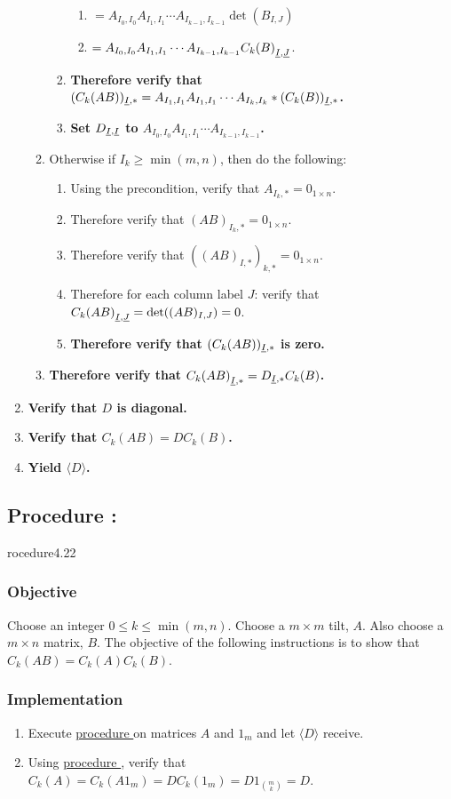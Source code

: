 \documentclass{article}
\newcommand{\ul}[1]{\protect\underline{#1}}
\newcounter{procedure}[part]
\newcommand{\procedure}[1]{\subsection*{Procedure \thepart:\theprocedure}\label{sec:procedure #1}\global\expandafter\edef\csname procedure#1\endcsname{\thepart:\theprocedure}\addtocounter{procedure}{1}}
\newcommand{\objective}{\subsubsection*{Objective}}
\newcommand{\implementation}{\subsubsection*{Implementation}}
\newcommand{\procedurehr}[1]{\hyperref[sec:procedure #1]{procedure \expandafter\csname procedure#1\endcsname}}
\begin{document}
\begin{multicols}{2}
\begin{enumerate}
\begin{enumerate}
\begin{enumerate}
\begin{enumerate}
								\item $=A_{I_0,I_0}A_{I_1,I_1}\cdots A_{I_{k-1},I_{k-1}}\det(B_{I,J})$
								\item $=A_{I_0,I_0}A_{I_1,I_1}\cdots A_{I_{k-1},I_{k-1}}{C_k(B)}_{\ul{I},\ul{J}}$.
							\end{enumerate}
							\item \textbf{Therefore verify that $(C_k(AB))_{\ul{I},*}=A_{I_1,I_1}A_{I_1,I_1}\cdots A_{I_k,I_k}*(C_k(B))_{\ul{I},*}$.}
							\item \textbf{Set $D_{\ul{I},\ul{I}}$ to $A_{I_0,I_0}A_{I_1,I_1}\cdots A_{I_{k-1},I_{k-1}}$.}
						\end{enumerate}
						\item Otherwise if $I_k\ge\min(m,n)$, then do the following:
						\begin{enumerate}
							\item Using the precondition, verify that $A_{I_k,*}=0_{1\times n}$.
							\item Therefore verify that $(AB)_{I_k,*}=0_{1\times n}$.
							\item Therefore verify that $((AB)_{I,*})_{k,*}=0_{1\times n}$.
							\item Therefore for each column label $J$: verify that ${C_k(AB)}_{\ul{I},\ul{J}}=\det((AB)_{I,J})=0$.
							\item \textbf{Therefore verify that $(C_k(AB))_{\ul{I},*}$ is zero.}
						\end{enumerate}
						\item \textbf{Therefore verify that ${C_k(AB)}_{\ul{I},*}=D_{\ul{I},*}C_k(B)$.}
					\end{enumerate}
					\item \textbf{Verify that $D$ is diagonal.}
					\item \textbf{Verify that $C_k(AB)=DC_k(B)$.}
					\item \textbf{Yield $\langle D\rangle$.}
				\end{enumerate}
		\procedure{4.22}
			\objective
				Choose an integer $0\le k\le\min(m,n)$. Choose a $m\times m$ tilt, $A$. Also choose a $m\times n$ matrix, $B$. The objective of the following instructions is to show that $C_k(AB)=C_k(A)C_k(B)$.
			\implementation
				\begin{enumerate}
					\item Execute \procedurehr{4.20} on matrices $A$ and $1_m$ and let $\langle D\rangle$ receive.
					\item Using \procedurehr{4.19}, verify that $C_k(A)=C_k(A1_m)=DC_k(1_m)=D1_{\binom{m}{k}}=D$.

\end{enumerate}
\end{multicols}
\end{document}
